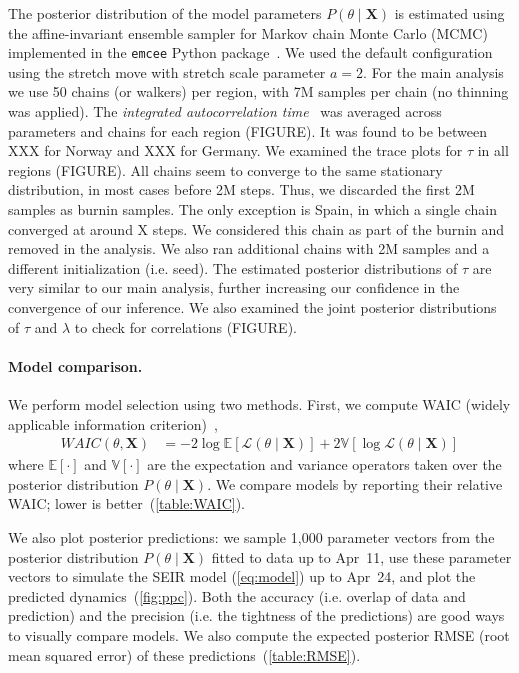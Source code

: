 \documentclass[12pt]{extarticle}
\let\vec\mathbf
\begin{document}
{The posterior distribution of the model parameters $P(\theta \mid \vec{X})$ is estimated using the affine-invariant ensemble sampler for Markov chain Monte Carlo (MCMC)~\citep{Goodman2010} implemented in the \texttt{emcee} Python package~\citep{Foreman-Mackey2013}. We used the default configuration using the stretch move with stretch scale parameter $a=2$.
For the main analysis we use 50 chains (or walkers) per region, with 7M samples per chain (no thinning was applied).
The \emph{integrated autocorrelation time}~\citep{Foreman-Mackey2013,Goodman2010} was averaged across parameters and chains for each region (FIGURE). 
It was found to be between XXX for Norway and XXX for Germany. 
We examined the trace plots for $\tau$ in all regions (FIGURE).
All chains seem to converge to the same stationary distribution, in most cases before 2M steps. Thus, we discarded the first 2M samples as burnin samples.
The only exception is Spain, in which a single chain converged at around X steps.
We considered this chain as part of the burnin and removed in the analysis.
We also ran additional chains with 2M samples and a different initialization (i.e. seed). The estimated posterior distributions of $\tau$ are very similar to our main analysis, further increasing our confidence in the convergence of our inference.
We also examined the joint posterior distributions of $\tau$ and $\lambda$ to check for correlations (FIGURE). %

\paragraph*{Model comparison.}
We perform model selection using two methods.
First, we compute WAIC (widely applicable information criterion)~\citep{gelman2013bayesian},
\begin{equation} \label{eq:WAIC}
\begin{aligned}
\mathit{WAIC}(\theta, \vec{X}) &= -2\log\mathbb{E}[\mathcal{L}(\theta \mid \vec{X})] + 2\mathbb{V}[\log\mathcal{L}(\theta \mid \vec{X})]
\end{aligned}
\end{equation}
where $\mathbb{E}[\cdot]$ and $\mathbb{V}[\cdot]$ are the expectation and variance operators taken over the posterior distribution $P(\theta \mid \vec{X})$.
We compare models by reporting their relative WAIC; lower is better~(\autoref{table:WAIC}).

We also plot posterior predictions: we sample 1,000 parameter vectors from the posterior distribution $P(\theta \mid \vec{X})$ fitted to data up to Apr~11, use these parameter vectors to simulate the SEIR model (\autoref{eq:model}) up to Apr~24, and plot the predicted dynamics~(\autoref{fig:ppc}).
Both the accuracy (i.e. overlap of data and prediction) and the precision (i.e. the tightness of the predictions) are good ways to visually compare models.
We also compute the expected posterior RMSE (root mean squared error) of these predictions~(\autoref{table:RMSE}).
} %
\end{document}

